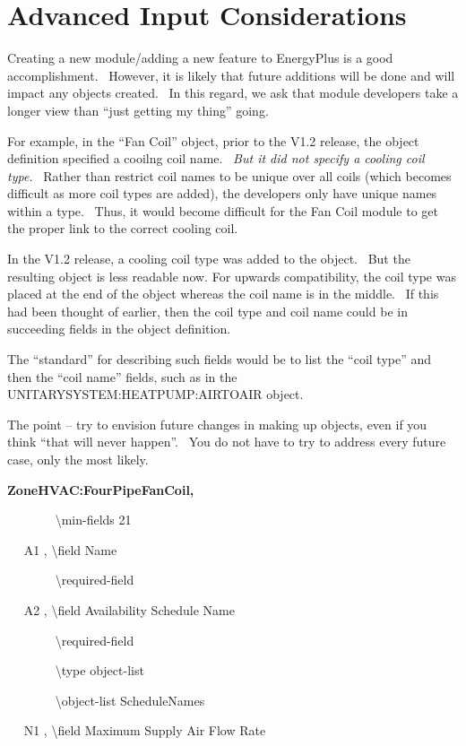 \section{Advanced Input Considerations}\label{advanced-input-considerations}

Creating a new module/adding a new feature to EnergyPlus is a good accomplishment.~ However, it is likely that future additions will be done and will impact any objects created.~ In this regard, we ask that module developers take a longer view than ``just getting my thing'' going.

For example, in the ``Fan Coil'' object, prior to the V1.2 release, the object definition specified a cooilng coil name.~ \emph{But it did not specify a cooling coil type.}~ Rather than restrict coil names to be unique over all coils (which becomes difficult as more coil types are added), the developers only have unique names within a type.~ Thus, it would become difficult for the Fan Coil module to get the proper link to the correct cooling coil.

In the V1.2 release, a cooling coil type was added to the object.~ But the resulting object is less readable now. For upwards compatibility, the coil type was placed at the end of the object whereas the coil name is in the middle.~ If this had been thought of earlier, then the coil type and coil name could be in succeeding fields in the object definition.

The ``standard'' for describing such fields would be to list the ``coil type'' and then the ``coil name'' fields, such as in the UNITARYSYSTEM:HEATPUMP:AIRTOAIR object.

The point -- try to envision future changes in making up objects, even if you think ``that will never happen''.~ You do not have to try to address every future case, only the most likely.

\textbf{ZoneHVAC:FourPipeFanCoil,}

~~~~~~~ \textbackslash{}min-fields 21

~~ A1 , \textbackslash{}field Name

~~~~~~~ \textbackslash{}required-field

~~ A2 , \textbackslash{}field Availability Schedule Name

~~~~~~~ \textbackslash{}required-field

~~~~~~~ \textbackslash{}type object-list

~~~~~~~ \textbackslash{}object-list ScheduleNames

~~ N1 , \textbackslash{}field Maximum Supply Air Flow Rate

